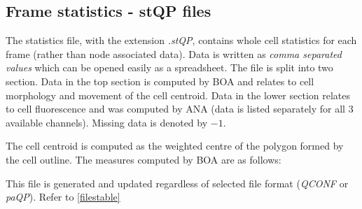 \documentclass[a4paper,12pt]{article}
\begin{document}
\subsection{Frame statistics - stQP files}
\label{stats}

The statistics file, with the extension \textit{.stQP}, contains whole cell statistics for each frame (rather than node associated
data).  Data is written as \textit{comma separated values} which can be opened easily as a spreadsheet.  The file is split into
two section.  Data in the top section is computed by BOA and relates to cell morphology and movement of the cell centroid.
Data in the lower section relates to cell fluorescence and was computed
by ANA (data is listed separately for all 3 available channels). Missing data is denoted by $-1$.

The cell centroid is computed as the weighted centre of the polygon formed by the cell outline.
The measures computed by BOA are as follows:

This file is generated and updated regardless of selected file format (\textit{QCONF} or \textit{paQP}). Refer to \autoref{filestable}
 
\end{document}
